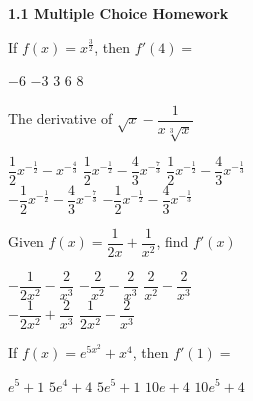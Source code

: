 \textbf{\large{1.1 Multiple Choice Homework}} \par

\begin{questions}
    \question If $f(x) = x^\frac{3}{2}$, then $f'(4) =$ \\
    
    \begin{oneparchoices}
        \choice $-6$ 
        \choice $-3$ 
        \choice $3$
        \choice $6$
        \choice $8$
    \end{oneparchoices} \par \horizontalline

    \question The derivative of $\sqrt x - \dfrac{1}{x\sqrt[3]{x}}$ \\

    \begin{oneparchoices}
        \choice $\dfrac{1}{2}x^{-\frac{1}{2}} - x^{-\frac{4}{3}}$
        \choice $\dfrac{1}{2}x^{-\frac{1}{2}} - \dfrac{4}{3}x^{-\frac{7}{3}}$ 
        \choice $\dfrac{1}{2}x^{-\frac{1}{2}} - \dfrac{4}{3}x^{-\frac{1}{3}}$ \\[11pt]
        \makebox[0.2 \textwidth] \choice $-\dfrac{1}{2}x^{-\frac{1}{2}} - \dfrac{4}{3}x^{-\frac{7}{3}}$ 
        \makebox[0.25 \textwidth] \choice $-\dfrac{1}{2}x^{-\frac{1}{2}} - \dfrac{4}{3}x^{-\frac{1}{3}}$
    \end{oneparchoices} \par \horizontalline

    \question Given $f(x) = \dfrac{1}{2x} + \dfrac{1}{x^2}$, find $f'(x)$ \\

    \begin{oneparchoices}
        \choice $-\dfrac{1}{2x^2} - \dfrac{2}{x^3}$ 
        \choice $-\dfrac{2}{x^2} - \dfrac{2}{x^3}$
        \choice $\dfrac{2}{x^2} - \dfrac{2}{x^3}$ \\
        \makebox[0.23 \textwidth] \choice $-\dfrac{1}{2x^2} + \dfrac{2}{x^3}$
        \makebox[0.29 \textwidth] \choice $\dfrac{1}{2x^2} - \dfrac{2}{x^3}$
    \end{oneparchoices} \par \horizontalline

    \question If $f(x) = e^{5x^2} + x^4$, then $f'(1)=$ \\

    \begin{oneparchoices}
        \choice $e^5 + 1$
        \choice $5e^4 + 4$ 
        \choice $5e^5 + 1$
        \choice $10e + 4$
        \choice $10e^5 + 4$
    \end{oneparchoices} \par \horizontalline


\end{questions}
